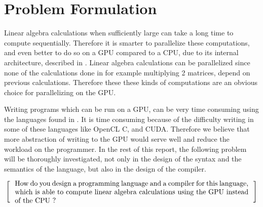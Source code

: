 \newpage
\section{Problem Formulation}

Linear algebra calculations when sufficiently large can take a long time to compute sequentially. 
Therefore it is smarter to parallelize these computations, and even better to do so on a GPU compared to a CPU, due to its internal architecture, described in .
Linear algebra calculations can be parallelized since none of the calculations done in for example multiplying 2 matrices, depend on previous calculations.
Therefore these these kinds of computations are an obvious choice for parallelizing on the GPU.

Writing programs which can be run on a GPU, can be very time consuming using the languages found in .
It is time consuming because of the difficulty writing in some of these languages like OpenCL C, and CUDA.
Therefore we believe that more abstraction of writing to the GPU would serve well and reduce the workload on the programmer.
In the rest of this report, the following problem will be thoroughly investigated, not only in the design of the syntax and the semantics of the language, but also in the design of the compiler.

\[
  \left[
  \begin{minipage}{\textwidth}
  \centering
  \begin{minipage}{0.96\textwidth}
  How do you design a programming language and a compiler for this language, which is able to compute linear algebra calculations using the GPU instead of the CPU ? %
  \end{minipage} 
  \end{minipage}                           
    \right]
\]